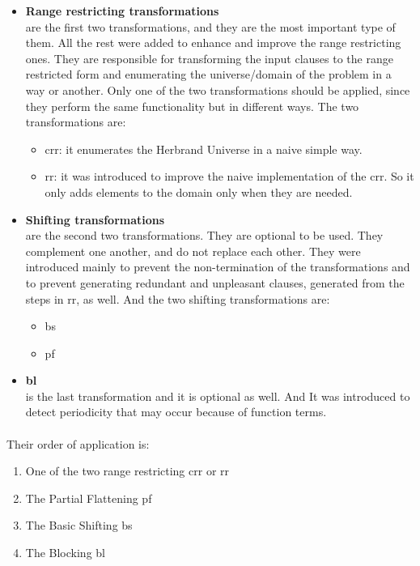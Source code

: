 		\begin{itemize}
			\item \textbf{Range restricting transformations}
			 \hfill \\ are the first two transformations, and they are the most important type of them. All the rest were added to enhance and improve the range restricting ones. They are responsible for transforming the input clauses to the range restricted form and enumerating the universe/domain of the problem in a way or another. Only one of the two transformations should be applied, since they perform the same functionality but in different ways. The two transformations are:
			 	\begin{itemize}
			 		\item \ac{crr}: it enumerates the Herbrand Universe in a naive simple way. 
			 		\item \ac{rr}: it was introduced to improve the naive implementation of the \ac{crr}. So it only adds elements to the domain only when they are needed.
			 	\end{itemize}
			
			\item \textbf{Shifting transformations}
			 \hfill \\ are the second two transformations. They are optional to be used. They complement one another, and do not replace each other. They were introduced mainly to prevent the non-termination of the transformations and to prevent generating redundant and unpleasant clauses, generated from the steps in \ac{rr}, as well. And the two shifting transformations are:
			 	\begin{itemize}
			 		\item \ac{bs}
			 		\item \ac{pf}
			 	\end{itemize}
			
			\item \textbf{\ac{bl}}
			 \hfill \\ is the last transformation and it is optional as well. And It was introduced to detect periodicity that may occur because of function terms. 
		\end{itemize}
		
		\paragraph{} 
		Their order of application is:
			\begin{enumerate}
				\item One of the two range restricting \ac{crr} or \ac{rr}
				\item The Partial Flattening \ac{pf}
				\item The Basic Shifting \ac{bs}
				\item The Blocking \ac{bl} 
			\end{enumerate} 

